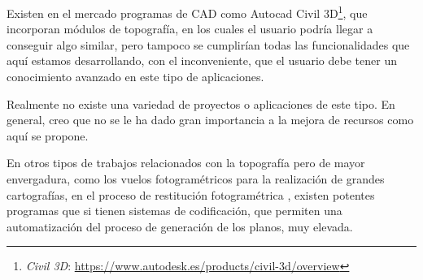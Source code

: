Existen en el mercado programas de CAD como Autocad Civil 3D\footnote{\textsl{Civil 3D}: \url{https://www.autodesk.es/products/civil-3d/overview}}, que incorporan módulos de topografía, en los cuales el usuario podría llegar a conseguir algo similar, pero tampoco se cumplirían todas las funcionalidades que aquí estamos desarrollando, con el inconveniente, que el usuario debe tener un conocimiento avanzado en este tipo de aplicaciones.

Realmente no existe una variedad de proyectos o aplicaciones de este tipo. En general, creo que no se le ha dado gran importancia a la mejora de recursos como aquí se propone.

En otros tipos de trabajos relacionados con la topografía pero de 
mayor envergadura, como los vuelos fotogramétricos para la realización de grandes cartografías, en el proceso de restitución fotogramétrica , existen potentes programas que si tienen sistemas de codificación, que permiten una automatización del proceso de generación de los planos, muy elevada.